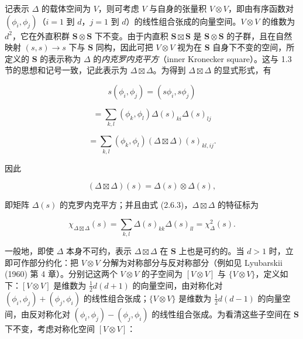 记表示 $\Delta$ 的载体空间为 $V$，则可考虑 $V$ 与自身的张量积 $V \otimes V$，即由有序函数对 $(\phi_{i}, \phi_{j})$（$i = 1$ 到 $d$，$j = 1$ 到 $d$）的线性组合张成的向量空间。$V \otimes V$ 的维数为 $d^{2}$，它在外直积群 $\mathbf{S} \otimes \mathbf{S}$ 下不变。由于内直积 $\mathbf{S} \boxtimes \mathbf{S}$ 是 $\mathbf{S} \otimes \mathbf{S}$ 的子群，且在自然映射 $(s, s) \rightarrow s$ 下与 $\mathbf{S}$ 同构，因此可把 $V \otimes V$ 视为在 $\mathbf{S}$ 自身下不变的空间，所定义的 $\mathbf{S}$ 的表示称为 $\Delta$ 的\textit{内克罗内克平方}（inner Kronecker square）。这与 1.3 节的思想和记号一致，记此表示为 $\Delta \boxtimes \Delta$。为得到 $\Delta \boxtimes \Delta$ 的显式形式，有

\begin{equation*}
s(\phi_{i}, \phi_{j}) = (s\phi_{i}, s\phi_{j})
\tag{2.6.2}
\end{equation*}

\begin{equation*}
= \sum_{k,l} (\phi_{k}, \phi_{l})\Delta(s)_{ki}\Delta(s)_{lj}
\tag{2.6.3}
\end{equation*}

\begin{equation*}
= \sum_{k,l} (\phi_{k}, \phi_{l})(\Delta \boxtimes \Delta)(s)_{kl,ij}.
\tag{2.6.4}
\end{equation*}

因此

\begin{equation*}
(\Delta \boxtimes \Delta)(s) = \Delta(s) \otimes \Delta(s),
\tag{2.6.5}
\end{equation*}

即矩阵 $\Delta(s)$ 的克罗内克平方；并且由式 (2.6.3)，$\Delta \boxtimes \Delta$ 的特征标为

\begin{equation*}
\chi_{\Delta \boxtimes \Delta}(s) = \sum_{k,l} \Delta(s)_{kk}\Delta(s)_{ll} = \chi_{\Delta}^{2}(s).
\tag{2.6.6}
\end{equation*}

一般地，即使 $\Delta$ 本身不可约，表示 $\Delta \boxtimes \Delta$ 在 $\mathbf{S}$ 上也是可约的。当 $d > 1$ 时，立即可作部分约化：把 $V \otimes V$ 分解为对称部分与反对称部分（例如见 Lyubarskii (1960) 第 4 章）。分别记这两个 $V \otimes V$ 的子空间为 $[V \otimes V]$ 与 $\{V \otimes V\}$，定义如下：$[V \otimes V]$ 是维数为 $\tfrac{1}{2}d(d+1)$ 的向量空间，由对称化对 $(\phi_{i}, \phi_{j}) + (\phi_{j}, \phi_{i})$ 的线性组合张成；$\{V \otimes V\}$ 是维数为 $\tfrac{1}{2}d(d-1)$ 的向量空间，由反对称化对 $(\phi_{i}, \phi_{j}) - (\phi_{j}, \phi_{i})$ 的线性组合张成。为看清这些子空间在 $\mathbf{S}$ 下不变，考虑对称化空间 $[V \otimes V]$：

